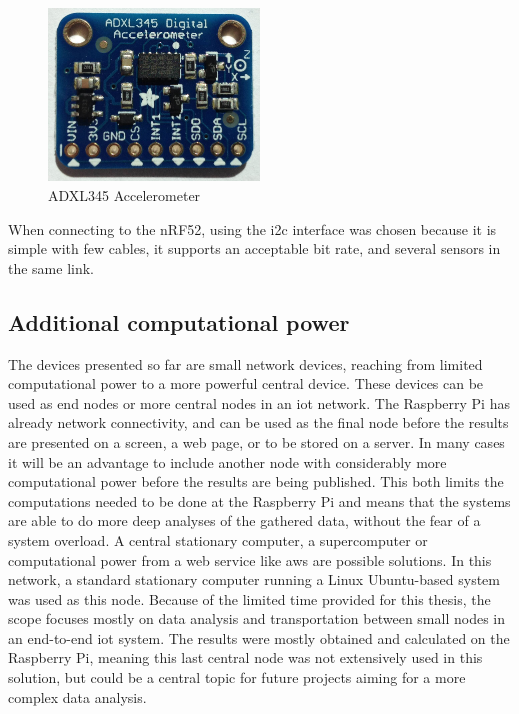 

\begin{figure}[ht]
    \centering
    \includegraphics[width=0.5\textwidth]{adxl345imagge}    
    \caption{ADXL345 Accelerometer}
    \label{fig:adxl345}
\end{figure}

\noindent When connecting to the \gls{nRF52}, using the \gls{i2c} interface was chosen because it is simple with few cables, it supports an acceptable bit rate, and several sensors in the same link. 

\subsection{Additional computational power}

\noindent The devices presented so far are small network devices, reaching from limited computational power to a more powerful central device. These devices can be used as end nodes or more central nodes in an \gls{iot} network. The \gls{Raspberry Pi} has already network connectivity, and can be used as the final node before the results are presented on a screen, a web page, or to be stored on a server. In many cases it will be an advantage to include another node with considerably more computational power before the results are being published. This both limits the computations needed to be done at the \gls{Raspberry Pi} and means that the systems are able to do more deep analyses of the gathered data, without the fear of a system overload. A central stationary computer, a supercomputer or computational power from a web service like \gls{aws} are possible solutions. In this network, a standard stationary computer running a Linux Ubuntu-based system was used as this node. Because of the limited time provided for this thesis, the scope focuses mostly on data analysis and transportation between small nodes in an end-to-end \gls{iot} system. The results were mostly obtained and calculated on the \gls{Raspberry Pi}, meaning this last central node was not extensively used in this solution, but could be a central topic for future projects aiming for a more complex data analysis. 

